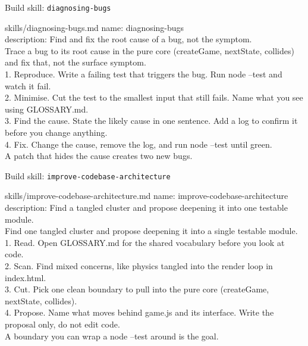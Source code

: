 \begin{frame}{Build skill: \texttt{diagnosing-bugs}}
  \begin{tdcodet}{skills/diagnosing-bugs.md}
    name: diagnosing-bugs\\
    description: Find and fix the root cause of a bug, not the symptom.\\[3pt]
    Trace a bug to its root cause in the pure core (createGame, nextState, collides) and fix that, not the surface symptom.\\[3pt]
    1. Reproduce. Write a failing test that triggers the bug. Run node --test and watch it fail.\\
    2. Minimise. Cut the test to the smallest input that still fails. Name what you see using GLOSSARY.md.\\
    3. Find the cause. State the likely cause in one sentence. Add a log to confirm it before you change anything.\\
    4. Fix. Change the cause, remove the log, and run node --test until green.\\[3pt]
    A patch that hides the cause creates two new bugs.
  \end{tdcodet}
\end{frame}

\begin{frame}{Build skill: \texttt{improve-codebase-architecture}}
  \begin{tdcodet}{skills/improve-codebase-architecture.md}
    name: improve-codebase-architecture\\
    description: Find a tangled cluster and propose deepening it into one testable module.\\[3pt]
    Find one tangled cluster and propose deepening it into a single testable module.\\[3pt]
    1. Read. Open GLOSSARY.md for the shared vocabulary before you look at code.\\
    2. Scan. Find mixed concerns, like physics tangled into the render loop in index.html.\\
    3. Cut. Pick one clean boundary to pull into the pure core (createGame, nextState, collides).\\
    4. Propose. Name what moves behind game.js and its interface. Write the proposal only, do not edit code.\\[3pt]
    A boundary you can wrap a node --test around is the goal.
  \end{tdcodet}
\end{frame}
